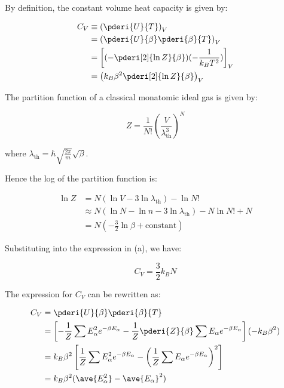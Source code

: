 \documentclass[12pt]{article}
\begin{document}

By definition, the constant volume heat capacity is given by:

\begin{equation}
\begin{split}
C_{V} &\equiv \left( \pderi{U}{T} \right)_{V} \\
      &= \left( \pderi{U}{\beta} \pderi{\beta}{T} \right)_{V} \\
      &= \left[ (-\pderi[2]{\ln{Z}}{\beta}) (-\frac{1}{k_{B} T^2}) \right]_{V} \\
      &= \left( k_{B} \beta^{2} \pderi[2]{\ln{Z}}{\beta} \right)_{V}
\end{split}
\end{equation}

The partition function of a classical monatomic ideal gas is given by:

\begin{equation}
Z = \frac{1}{N!} \left( \frac{V}{\lambda_{\text{th}}^{3}} \right)^{N}
\end{equation}

where $\lambda_{\text{th}} = \hbar \sqrt{\frac{2\pi}{m}} \sqrt{\beta}$.

Hence the log of the partition function is:

\begin{equation}
\begin{split}
\ln{Z} &= N (\ln{V} - 3\ln{\lambda_{\text{th}}}) - \ln{N!} \\
       &\approx N (\ln{N} - \ln{n} - 3\ln{\lambda_{\text{th}}}) - N \ln{N!} + N \\
       &= N \left( -\frac{3}{2} \ln{\beta} + \text{constant} \right)
\end{split}
\end{equation}

Substituting into the expression in (a), we have:

\begin{equation}
C_{V} = \frac{3}{2} k_{B} N
\end{equation}

The expression for $C_{V}$ can be rewritten as:

\begin{equation}
\begin{split}
C_{V} &= \pderi{U}{\beta} \pderi{\beta}{T} \\
      &= \left[ -\frac{1}{Z} \sum E_{\alpha}^{2} e^{-\beta E_{\alpha}} - \frac{1}{Z} \pderi{Z}{\beta} \sum E_{\alpha} e^{-\beta E_{\alpha}} \right] (-k_{B} \beta^{2}) \\
      &= k_{B} \beta^{2} \left[ \frac{1}{Z} \sum E_{\alpha}^{2} e^{-\beta E_{\alpha}} - \left( \frac{1}{Z} \sum E_{\alpha} e^{-\beta E_{\alpha}} \right)^{2} \right] \\
      &= k_{B} \beta^{2} (\ave{E_{\alpha}^{2}} - \ave{E_{\alpha}}^{2})
\end{split}
\end{equation}
\end{document}
